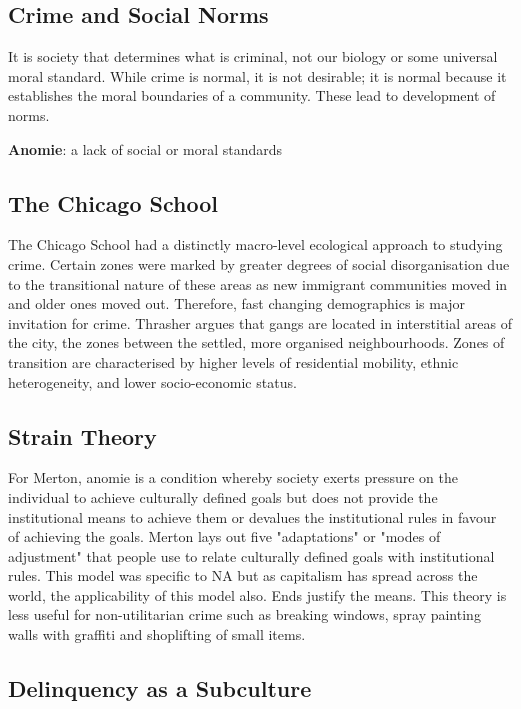 \documentclass{article}
\begin{document}
\subsection{Crime and Social Norms}

It is society that determines what is criminal, not our biology or some universal moral standard. While crime is normal, it is not desirable; it is normal because it establishes the moral boundaries of a community. These lead to development of norms. 

\textbf{Anomie}: a lack of social or moral standards

\subsection{The Chicago School}

The Chicago School had a distinctly macro-level ecological approach to studying crime. Certain zones were marked by greater degrees of social disorganisation due to the transitional nature of these areas as new immigrant communities moved in and older ones moved out. Therefore, fast changing demographics is major invitation for crime. Thrasher argues that gangs are located in interstitial areas of the city, the zones between the settled, more organised neighbourhoods. Zones of transition are characterised by higher levels of residential mobility, ethnic heterogeneity, and lower socio-economic status.

\subsection{Strain Theory}

For Merton, anomie is a condition whereby society exerts pressure on the individual to achieve culturally defined goals but does not provide the institutional means to achieve them or devalues the institutional rules in favour of achieving the goals. Merton lays out five "adaptations" or "modes of adjustment" that people use to relate culturally defined goals with institutional rules. This model was specific to NA but as capitalism has spread across the world, the applicability of this model also. Ends justify the means. This theory is less useful for non-utilitarian crime such as breaking windows, spray painting walls with graffiti and shoplifting of small items.

\subsection{Delinquency as a Subculture}
\end{document}
